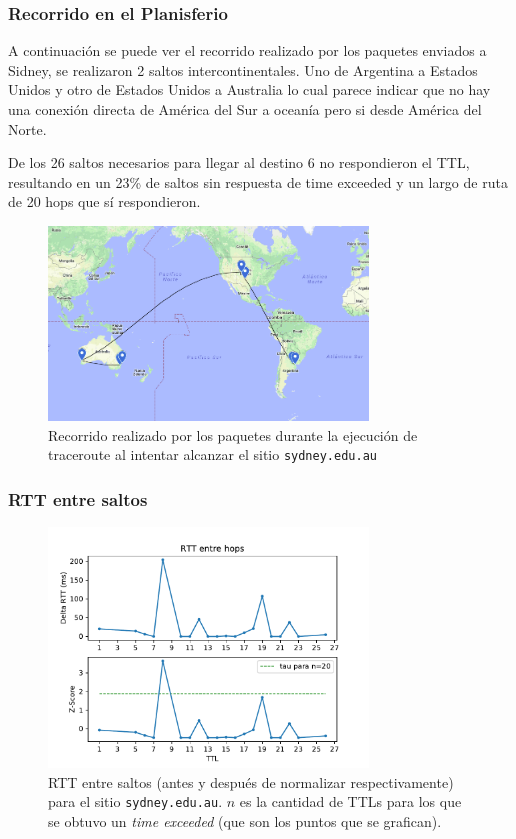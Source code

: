 \subsubsection*{Recorrido en el Planisferio}


A continuación se puede ver el recorrido realizado por los paquetes enviados a Sidney, se realizaron 2 saltos intercontinentales. Uno de Argentina a Estados Unidos y otro de Estados Unidos a Australia lo cual parece indicar que no hay una conexión directa de América del Sur a oceanía pero si desde América del Norte.

De los 26 saltos necesarios para llegar al destino 6 no respondieron el TTL, resultando en un 23\% de saltos sin respuesta de time exceeded y un largo de ruta de 20 hops que sí respondieron.

\begin{figure}[H]
  \centering
  \includegraphics[width=8.5cm]{figs/sidney.png}
  \caption{\footnotesize Recorrido realizado por los paquetes durante la ejecución de traceroute al intentar alcanzar el sitio \texttt{sydney.edu.au}}
\end{figure}

\subsubsection*{RTT entre saltos}

\begin{figure}[H]
  \centering
  \includegraphics[width=8.5cm]{figs/traceroute-sidney.pdf}
  \caption{\footnotesize RTT entre saltos (antes y después de normalizar respectivamente) para el sitio \texttt{sydney.edu.au}. $n$ es la cantidad de TTLs para los que se obtuvo un \emph{time exceeded} (que son los puntos que se grafican).}
\end{figure}

